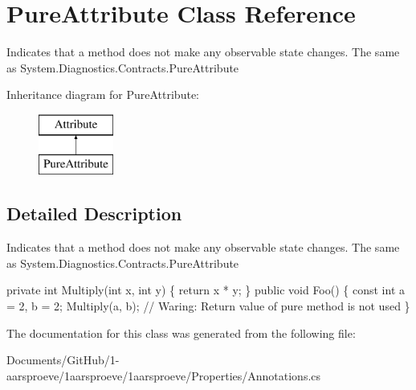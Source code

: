 \hypertarget{class_pure_attribute}{}\section{Pure\+Attribute Class Reference}
\label{class_pure_attribute}


Indicates that a method does not make any observable state changes. The same as {\ttfamily System.\+Diagnostics.\+Contracts.\+Pure\+Attribute}  


Inheritance diagram for Pure\+Attribute\+:\begin{figure}[H]
\begin{center}
\leavevmode
\includegraphics[height=2.000000cm]{class_pure_attribute}
\end{center}
\end{figure}


\subsection{Detailed Description}
Indicates that a method does not make any observable state changes. The same as {\ttfamily System.\+Diagnostics.\+Contracts.\+Pure\+Attribute} 


\begin{DoxyCode}
[Pure] \textcolor{keyword}{private} \textcolor{keywordtype}{int} Multiply(\textcolor{keywordtype}{int} x, \textcolor{keywordtype}{int} y) \{ \textcolor{keywordflow}{return} x * y; \}
\textcolor{keyword}{public} \textcolor{keywordtype}{void} Foo() \{
  \textcolor{keyword}{const} \textcolor{keywordtype}{int} a = 2, b = 2;
  Multiply(a, b); \textcolor{comment}{// Waring: Return value of pure method is not used}
\}
\end{DoxyCode}


The documentation for this class was generated from the following file\+:\begin{DoxyCompactItemize}
\item 
Documents/\+Git\+Hub/1-\/aarsproeve/1aarsproeve/1aarsproeve/\+Properties/Annotations.\+cs\end{DoxyCompactItemize}
